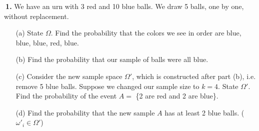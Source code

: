 \documentclass[12pt]{report}
\begin{document}
\noindent {} $~$\textbf{1.} We have an urn with 3 red and 10 blue balls. We draw 5 balls, one by one, without replacement. 
\begin{itemize}
\item [(a)] State $\Omega$. Find the probability that the colors we see in order are blue, blue, blue, red, blue.		%
\item [(b)] Find the probability that our sample of balls were all blue.
\item [(c)] Consider the new sample space $\Omega'$, which is constructed after part (b), i.e. remove 5 blue balls. Suppose we changed our sample size to $k=4$. State $\Omega'$. Find the probability of the event $A=$ \{2 are red and 2 are blue\}.
\item [(d)]  Find the probability that the new sample $A$ has at least 2 blue balls. ($\omega'_i\in\Omega'$)
\end{itemize}
%
\end{document}

